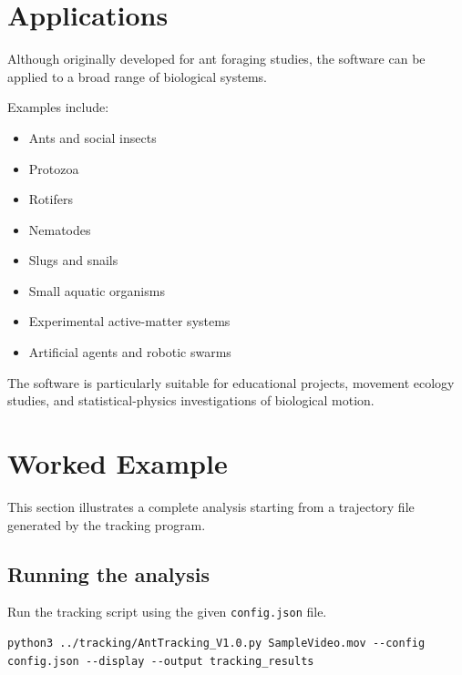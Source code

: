 \documentclass[11pt,a4paper]{article}
\begin{document}
\section{Applications}

Although originally developed for ant foraging studies, the software can be applied to a broad range of biological systems.

Examples include:

\begin{itemize}
\item Ants and social insects
\item Protozoa
\item Rotifers
\item Nematodes
\item Slugs and snails
\item Small aquatic organisms
\item Experimental active-matter systems
\item Artificial agents and robotic swarms
\end{itemize}

The software is particularly suitable for educational projects, movement ecology studies, and statistical-physics investigations of biological motion.

\section{Worked Example}

This section illustrates a complete analysis starting from a trajectory file generated by the tracking program.

\subsection{Running the analysis}

Run the tracking script using the given \texttt{config.json} file.

\begin{verbatim}
python3 ../tracking/AntTracking_V1.0.py SampleVideo.mov --config config.json --display --output tracking_results 
\end{verbatim}
\end{document}
